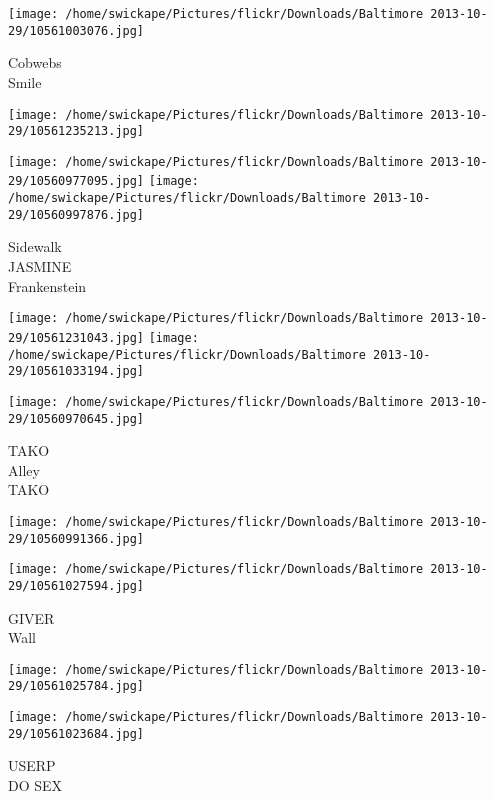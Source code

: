 \documentclass[10pt,letterpaper]{article}
\begin{document}
\vspace{0.25in}
\texttt{[image: /home/swickape/Pictures/flickr/Downloads/Baltimore 2013-10-29/10561003076.jpg]}

Cobwebs\\
Smile\\
\pagebreak

\texttt{[image: /home/swickape/Pictures/flickr/Downloads/Baltimore 2013-10-29/10561235213.jpg]}

\vspace{0.25in}
\texttt{[image: /home/swickape/Pictures/flickr/Downloads/Baltimore 2013-10-29/10560977095.jpg]}
\texttt{[image: /home/swickape/Pictures/flickr/Downloads/Baltimore 2013-10-29/10560997876.jpg]}

Sidewalk\\
JASMINE\\
Frankenstein\\
\pagebreak

\texttt{[image: /home/swickape/Pictures/flickr/Downloads/Baltimore 2013-10-29/10561231043.jpg]}
\texttt{[image: /home/swickape/Pictures/flickr/Downloads/Baltimore 2013-10-29/10561033194.jpg]}

\texttt{[image: /home/swickape/Pictures/flickr/Downloads/Baltimore 2013-10-29/10560970645.jpg]}

TAKO\\
Alley\\
TAKO\\
\pagebreak

\texttt{[image: /home/swickape/Pictures/flickr/Downloads/Baltimore 2013-10-29/10560991366.jpg]}

\vspace{0.25in}
\texttt{[image: /home/swickape/Pictures/flickr/Downloads/Baltimore 2013-10-29/10561027594.jpg]}

GIVER\\
Wall\\
\pagebreak

\texttt{[image: /home/swickape/Pictures/flickr/Downloads/Baltimore 2013-10-29/10561025784.jpg]}

\vspace{0.25in}
\texttt{[image: /home/swickape/Pictures/flickr/Downloads/Baltimore 2013-10-29/10561023684.jpg]}

USERP\\
DO SEX\\
\pagebreak
\end{document}
